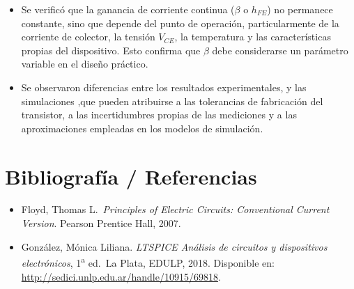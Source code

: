 \documentclass[12pt,a4paper]{article}
\begin{document}
\begin{itemize}
\item Se verificó que la ganancia de corriente continua ($\beta$ o $h_{FE}$) no permanece constante, sino que depende
      del punto de operación, particularmente de la corriente de colector, la tensión $V_{CE}$, la temperatura y las
      características propias del dispositivo. Esto confirma que $\beta$ debe considerarse un parámetro variable en el
      diseño práctico.

\item Se observaron diferencias entre los resultados experimentales, y las simulaciones ,que pueden atribuirse a las
      tolerancias de fabricación del transistor, a las incertidumbres propias de las mediciones y a las aproximaciones
      empleadas en los modelos de simulación.

\end{itemize}




\section{Bibliografía / Referencias}

\begin{itemize}
    \item Floyd, Thomas L.\ \textit{Principles of Electric Circuits: Conventional
    Current Version}. Pearson Prentice Hall, 2007.
 
    \item Gonz\'alez, M\'onica Liliana. \textit{LTSPICE An\'alisis de circuitos y
    dispositivos electr\'onicos}, 1\textsuperscript{a} ed.\ La Plata, EDULP, 2018.
    Disponible en: \url{http://sedici.unlp.edu.ar/handle/10915/69818}.
 
\end{itemize}
 
\end{document}
